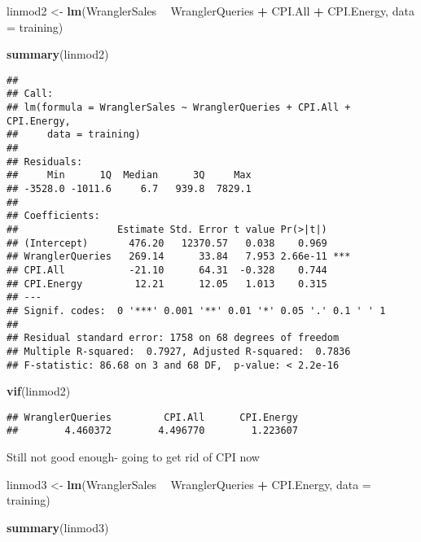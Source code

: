 \documentclass[]{article}
\newenvironment{Shaded}{\begin{snugshade}}{\end{snugshade}}
\newcommand{\KeywordTok}[1]{\textcolor[rgb]{0.13,0.29,0.53}{\textbf{#1}}}
\newcommand{\DataTypeTok}[1]{\textcolor[rgb]{0.13,0.29,0.53}{#1}}
\newcommand{\StringTok}[1]{\textcolor[rgb]{0.31,0.60,0.02}{#1}}
\newcommand{\OperatorTok}[1]{\textcolor[rgb]{0.81,0.36,0.00}{\textbf{#1}}}
\newcommand{\NormalTok}[1]{#1}
\begin{document}
\begin{Shaded}
\begin{Highlighting}[]
\NormalTok{linmod2 <-}\StringTok{ }\KeywordTok{lm}\NormalTok{(WranglerSales }\OperatorTok{~}\StringTok{ }\NormalTok{WranglerQueries }\OperatorTok{+}\StringTok{ }\NormalTok{CPI.All }\OperatorTok{+}\StringTok{ }\NormalTok{CPI.Energy, }\DataTypeTok{data =}\NormalTok{ training)}

\KeywordTok{summary}\NormalTok{(linmod2)}
\end{Highlighting}
\end{Shaded}

\begin{verbatim}
## 
## Call:
## lm(formula = WranglerSales ~ WranglerQueries + CPI.All + CPI.Energy, 
##     data = training)
## 
## Residuals:
##     Min      1Q  Median      3Q     Max 
## -3528.0 -1011.6     6.7   939.8  7829.1 
## 
## Coefficients:
##                 Estimate Std. Error t value Pr(>|t|)    
## (Intercept)       476.20   12370.57   0.038    0.969    
## WranglerQueries   269.14      33.84   7.953 2.66e-11 ***
## CPI.All           -21.10      64.31  -0.328    0.744    
## CPI.Energy         12.21      12.05   1.013    0.315    
## ---
## Signif. codes:  0 '***' 0.001 '**' 0.01 '*' 0.05 '.' 0.1 ' ' 1
## 
## Residual standard error: 1758 on 68 degrees of freedom
## Multiple R-squared:  0.7927, Adjusted R-squared:  0.7836 
## F-statistic: 86.68 on 3 and 68 DF,  p-value: < 2.2e-16
\end{verbatim}

\begin{Shaded}
\begin{Highlighting}[]
\KeywordTok{vif}\NormalTok{(linmod2)}
\end{Highlighting}
\end{Shaded}

\begin{verbatim}
## WranglerQueries         CPI.All      CPI.Energy 
##        4.460372        4.496770        1.223607
\end{verbatim}

Still not good enough- going to get rid of CPI now

\begin{Shaded}
\begin{Highlighting}[]
\NormalTok{linmod3 <-}\StringTok{ }\KeywordTok{lm}\NormalTok{(WranglerSales }\OperatorTok{~}\StringTok{ }\NormalTok{WranglerQueries }\OperatorTok{+}\StringTok{ }\NormalTok{CPI.Energy, }\DataTypeTok{data =}\NormalTok{ training)}

\KeywordTok{summary}\NormalTok{(linmod3)}
\end{Highlighting}
\end{Shaded}
\end{document}
